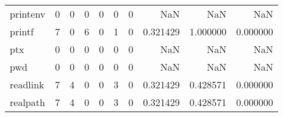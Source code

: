 \begin{tabular}{lrrrrrrrrr}
printenv  &                                                  0 &                                                  0 &                                                  0 &                                                  0 &                                                  0 &                                                  0 &                                                NaN &                                    NaN &                                  NaN \\
printf    &                                                  7 &                                                  0 &                                                  6 &                                                  0 &                                                  1 &                                                  0 &                                           0.321429 &                               1.000000 &                             0.000000 \\
ptx       &                                                  0 &                                                  0 &                                                  0 &                                                  0 &                                                  0 &                                                  0 &                                                NaN &                                    NaN &                                  NaN \\
pwd       &                                                  0 &                                                  0 &                                                  0 &                                                  0 &                                                  0 &                                                  0 &                                                NaN &                                    NaN &                                  NaN \\
readlink  &                                                  7 &                                                  4 &                                                  0 &                                                  0 &                                                  3 &                                                  0 &                                           0.321429 &                               0.428571 &                             0.000000 \\
realpath  &                                                  7 &                                                  4 &                                                  0 &                                                  0 &                                                  3 &                                                  0 &                                           0.321429 &                               0.428571 &                             0.000000 \\

\end{tabular}

